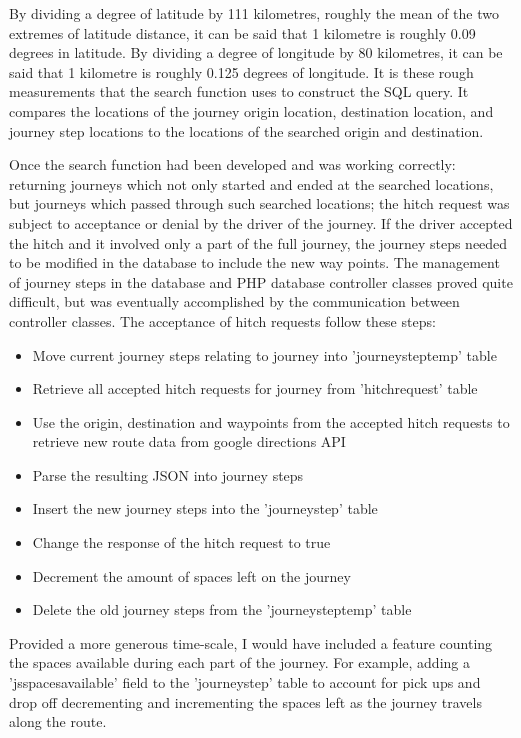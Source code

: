 By dividing a degree of latitude by 111 kilometres, roughly the mean of the two extremes of latitude distance, it can be said that 1 kilometre is roughly 0.09 degrees in latitude. By dividing a degree of longitude by 80 kilometres, it can be said that 1 kilometre is roughly 0.125 degrees of longitude. It is these rough measurements that the search function uses to construct the SQL query. It compares the locations of the journey origin location, destination location, and journey step locations to the locations of the searched origin and destination.

Once the search function had been developed and was working correctly: returning journeys which not only started and ended at the searched locations, but journeys which passed through such searched locations; the hitch request was subject to acceptance or denial by the driver of the journey. If the driver accepted the hitch and it involved only a part of the full journey, the journey steps needed to be modified in the database to include the new way points. The management of journey steps in the database and PHP database controller classes proved quite difficult, but was eventually accomplished by the communication between controller classes. The acceptance of hitch requests follow these steps:

\begin{itemize}
\item Move current journey steps relating to journey into 'journey\textunderscore step\textunderscore temp' table
\item Retrieve all accepted hitch requests for journey from 'hitch\textunderscore request' table
\item Use the origin, destination and waypoints from the accepted hitch requests to retrieve new route data from google directions API
\item Parse the resulting JSON into journey steps
\item Insert the new journey steps into the 'journey\textunderscore step' table
\item Change the response of the hitch request to true
\item Decrement the amount of spaces left on the journey
\item Delete the old journey steps from the 'journey\textunderscore step\textunderscore temp' table
\end{itemize}

Provided a more generous time-scale, I would have included a feature counting the spaces available during each part of the journey. For example, adding a 'js\textunderscore spaces\textunderscore available' field to the 'journey\textunderscore step' table to account for pick ups and drop off decrementing and incrementing the spaces left as the journey travels along the route.
	
